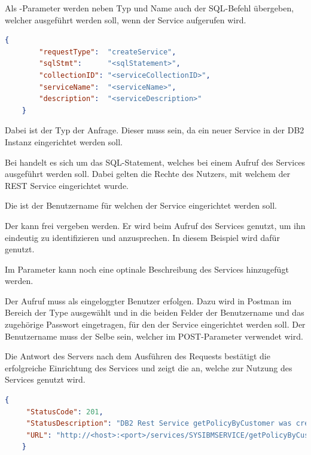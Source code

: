 Als -Parameter werden neben Typ und Name auch der SQL-Befehl übergeben, welcher ausgeführt werden soll, wenn der
Service aufgerufen wird.

\begin{lstlisting}[language=json, caption=Parameter zur Erstellung, label=Parameter zur Erstellung]
    {
        "requestType":  "createService",
        "sqlStmt":      "<sqlStatement>",
        "collectionID": "<serviceCollectionID>",
        "serviceName":  "<serviceName>",
        "description":  "<serviceDescription>"
    }
\end{lstlisting}

Dabei ist  der Typ der Anfrage. Dieser muss  sein, da ein neuer Service in der
DB2 Instanz eingerichtet werden soll.

Bei  handelt es sich um das SQL-Statement, welches bei einem Aufruf des Services ausgeführt werden soll.
Dabei gelten die Rechte des Nutzers, mit welchem der REST Service eingerichtet wurde.

Die  ist der Benutzername für welchen der Service eingerichtet werden soll.

Der  kann frei vergeben werden. Er wird beim Aufruf des Services genutzt, um ihn eindeutig zu
identifizieren und anzusprechen. In diesem Beispiel wird dafür  genutzt.

Im Parameter  kann noch eine optinale Beschreibung des Services hinzugefügt werden.

Der Aufruf muss als eingeloggter Benutzer erfolgen. Dazu wird in Postman im Bereich  der Type
 ausgewählt und in die beiden Felder der Benutzername und das zugehörige Passwort eingetragen, für den
der Service eingerichtet werden soll. Der Benutzername muss der Selbe sein, welcher im POST-Parameter 
verwendet wird.

Die Antwort des Servers nach dem Ausführen des Requests bestätigt die erfolgreiche Einrichtung des Services und zeigt die
 an, welche zur Nutzung des Services genutzt wird.

\begin{lstlisting}[language=json, caption=Antwort des Servers, label=Antwort des Servers]
    {
     "StatusCode": 201,
     "StatusDescription": "DB2 Rest Service getPolicyByCustomer was created successfully.",
     "URL": "http://<host>:<port>/services/SYSIBMSERVICE/getPolicyByCustomer"
    }
\end{lstlisting}

